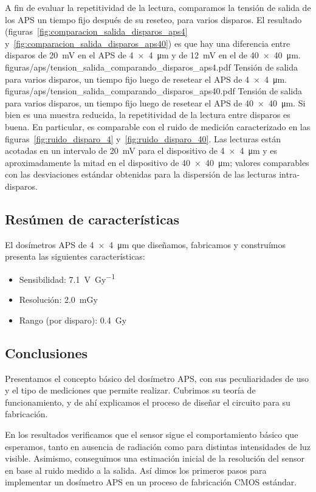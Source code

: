 A fin de evaluar la repetitividad de la lectura, comparamos la tensión de salida de los APS un tiempo fijo después de su reseteo, para varios disparos.
El resultado (figuras~\ref{fig:comparacion_salida_disparos_aps4} y~\ref{fig:comparacion_salida_disparos_aps40}) es que hay una diferencia entre disparos de \SI{20}{\milli\volt} en el APS de \SI{4x4}{\micro\meter} y de \SI{12}{\milli\volt} en el de \SI{40x40}{\micro\meter}.
{figuras/aps/tension_salida_comparando_disparos_aps4.pdf}
{Tensión de salida para varios disparos, un tiempo fijo luego de resetear el APS de \SI{4x4}{\micro\meter}.}
{figuras/aps/tension_salida_comparando_disparos_aps40.pdf}
{Tensión de salida para varios disparos, un tiempo fijo luego de resetear el APS de \SI{40x40}{\micro\meter}.}
Si bien es una muestra reducida, la repetitividad de la lectura entre disparos es buena.
En particular, es comparable con el ruido de medición caracterizado en las figuras~\ref{fig:ruido_disparo_4} y~\ref{fig:ruido_disparo_40}.
Las lecturas están acotadas en un intervalo de \SI{20}{\milli\volt} para el dispositivo de \SI{4x4}{\micro\meter} y es aproximadamente la mitad en el dispositivo de \SI{40x40}{\micro\meter}; valores comparables con las desviaciones estándar obtenidas para la dispersión de las lecturas intra-disparos.
%
\subsection{Resúmen de características}
El dosímetros APS de \SI{4x4}{\micro\meter} que diseñamos, 
fabricamos y construímos presenta las
siguientes características:
\begin{itemize}
    \item Sensibilidad: \SI{7.1}{\volt\per\gray}
    \item Resolución: \SI{2.0}{\milli\gray}
    \item Rango (por disparo): \SI{0.4}{\gray}
\end{itemize}
%
\subsection{Conclusiones}
Presentamos el concepto básico del dosímetro APS,
con sus peculiaridades de uso y el tipo de mediciones que permite realizar.
Cubrimos su teoría de funcionamiento,
y de ahí explicamos el proceso de diseñar el circuito
para su fabricación.

En los resultados verificamos que el sensor
sigue el comportamiento básico que esperamos,
tanto en ausencia de radiación 
como para distintas intensidades de luz visible.
Asimismo, conseguimos una estimación inicial de la resolución del sensor
en base al ruido medido a la salida.
Así dimos los primeros pasos para implementar un dosímetro APS
en un proceso de fabricación CMOS estándar.

